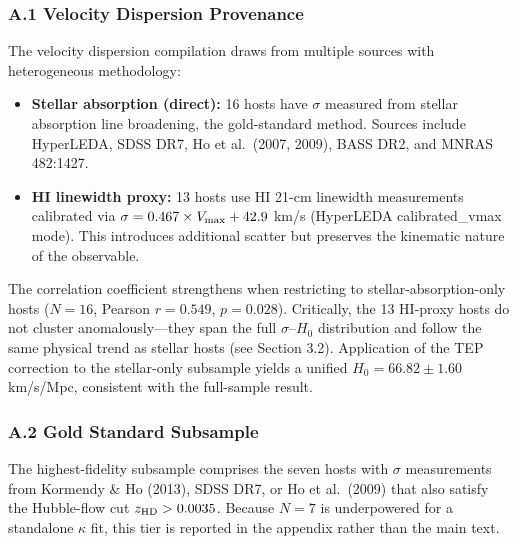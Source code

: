 \documentclass[
]{article}
\begin{document}
\subsubsection{A.1 Velocity Dispersion
Provenance}\label{a.1-velocity-dispersion-provenance}

The velocity dispersion compilation draws from multiple sources with
heterogeneous methodology:

\begin{itemize}
\item
  \textbf{Stellar absorption (direct):} 16 hosts have \(\sigma\)
  measured from stellar absorption line broadening, the gold-standard
  method. Sources include HyperLEDA, SDSS DR7, Ho et al.~(2007, 2009),
  BASS DR2, and MNRAS 482:1427.
\item
  \textbf{HI linewidth proxy:} 13 hosts use HI 21-cm linewidth
  measurements calibrated via
  \(\sigma = 0.467 \times V_{\rm max} + 42.9\) km/s (HyperLEDA
  calibrated\_vmax mode). This introduces additional scatter but
  preserves the kinematic nature of the observable.
\end{itemize}

The correlation coefficient strengthens when restricting to
stellar-absorption-only hosts (\(N=16\), Pearson \(r = 0.549\),
\(p = 0.028\)). Critically, the 13 HI-proxy hosts do not cluster
anomalously---they span the full \(\sigma\)--\(H_0\) distribution and
follow the same physical trend as stellar hosts (see Section 3.2).
Application of the TEP correction to the stellar-only subsample yields a
unified \(H_0 = 66.82 \pm 1.60\) km/s/Mpc, consistent with the
full-sample result.

\subsubsection{A.2 Gold Standard
Subsample}\label{a.2-gold-standard-subsample}

The highest-fidelity subsample comprises the seven hosts with \(\sigma\)
measurements from Kormendy \& Ho (2013), SDSS DR7, or Ho et al.~(2009)
that also satisfy the Hubble-flow cut \(z_{\rm HD}>0.0035\).
Because \(N=7\) is underpowered for a standalone \(\kappa\) fit, this
tier is reported in the appendix rather than the main text.
\end{document}
